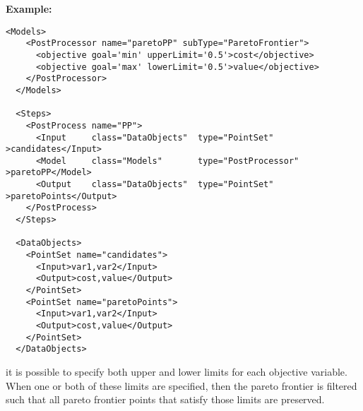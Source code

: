 \textbf{Example:}
\begin{lstlisting}[style=XML,morekeywords={anAttribute},caption=ParetoFrontier input example (no expand)., label=lst:ParetoFrontier_PP_InputExample]
  <Models>
    <PostProcessor name="paretoPP" subType="ParetoFrontier">
      <objective goal='min' upperLimit='0.5'>cost</objective>
      <objective goal='max' lowerLimit='0.5'>value</objective>
    </PostProcessor>
  </Models>

  <Steps>
    <PostProcess name="PP">
      <Input     class="DataObjects"  type="PointSet"        >candidates</Input>
      <Model     class="Models"       type="PostProcessor"   >paretoPP</Model>
      <Output    class="DataObjects"  type="PointSet"        >paretoPoints</Output>
    </PostProcess>
  </Steps>

  <DataObjects>
    <PointSet name="candidates">
      <Input>var1,var2</Input>
      <Output>cost,value</Output>
    </PointSet>
    <PointSet name="paretoPoints">
      <Input>var1,var2</Input>
      <Output>cost,value</Output>
    </PointSet>
  </DataObjects>
\end{lstlisting}

\nb it is possible to specify both upper and lower limits for each objective variable.
When one or both of these limits are specified, then the pareto frontier is filtered such that all pareto frontier points that
satisfy those limits are preserved.


